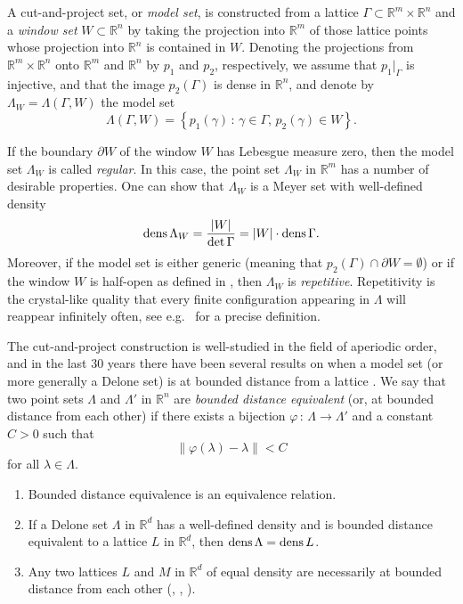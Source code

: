 \documentclass[12pt,a4paper,oneside]{amsart}
\theoremstyle{plain}
\theoremstyle{definition}
\newcommand{\Abs}[1]{{\left|{#1}\right|}}
\newcommand{\dens}{{\rm dens\,}}
\newcounter{rem}
\begin{document}
A cut-and-project set, or \emph{model set}, is constructed from a lattice $\Gamma \subset \mathbb{R}^m \times \mathbb{R}^n$ and a \emph{window set} $W\subset \mathbb{R}^n$ by taking the projection into $\mathbb{R}^m$ of those lattice points whose projection into $\mathbb{R}^n$ is contained in $W$. Denoting the projections from $\mathbb{R}^m \times \mathbb{R}^n$ onto $\mathbb{R}^m$ and $\mathbb{R}^n$ by $p_1$ and $p_2$, respectively, we assume that $p_1 |_{\Gamma}$ is injective, and that the image $p_2(\Gamma)$ is dense in $\mathbb{R}^n$, and denote by $\Lambda_W=\Lambda(\Gamma,W)$ the model set
\begin{equation*}
\Lambda (\Gamma, W) = \left\{ p_1(\gamma) \, : \, \gamma \in \Gamma , \, p_2(\gamma) \in W \right\} .
\end{equation*}

If the boundary $\partial W$ of the window $W$ has Lebesgue measure zero, then the model set $\Lambda_W$ is called \emph{regular}. In this case, the point set $\Lambda_W$ in $\mathbb{R}^m$ has a number of desirable properties. One can show that $\Lambda_W$ is a Meyer set with well-defined density 
\begin{equation*}
    \dens \Lambda_W = \frac{|W|}{\det \Gamma} = \Abs{W} \cdot \dens\Gamma.
\end{equation*}
Moreover, if the model set is either generic (meaning that $p_2(\Gamma) \cap \partial W = \emptyset$) or if the window $W$ is half-open as defined in \cite[Definition 2.2]{P2000}, then $\Lambda_W$ is \emph{repetitive}. Repetitivity is the crystal-like quality that every finite configuration appearing in $\Lambda$ will reappear infinitely often, see e.g.\ \cite[Property 2]{P2000} for a precise definition.

The cut-and-project construction is well-studied in the field of aperiodic order, and in the last 30 years there have been several results on when a model set (or more generally a Delone set) is at bounded distance from a lattice \cite{DO1991, FG2018, Lac1992}. We say that two point sets $\Lambda$ and $\Lambda'$ in $\mathbb{R}^n$ are \textit{bounded distance equivalent} (or, at bounded distance from each other) if there exists a bijection $\varphi \, : \, \Lambda \to \Lambda'$ and a constant $C>0$ such that
\[\|\varphi (\lambda)-\lambda \| < C\]
for all $\lambda \in \Lambda$.

\begin{enumerate}
\item Bounded distance equivalence is an equivalence relation.
\item If a Delone set $\Lambda$ in $\mathbb{R}^d$ has a well-defined density and is bounded distance equivalent to a lattice $L$ in $\mathbb{R}^d$, then $\dens  \Lambda = \dens L$.
\item Any two lattices $L$ and $M$ in $\mathbb{R}^d$ of equal density are necessarily {at bounded distance from each other} (\cite[Theorem 5.2]{DO1990}, \cite[Theorem 1]{DO1991}, \cite[\S 3.2]{kolountzakis1997multi}).
\end{enumerate}
\end{document}
